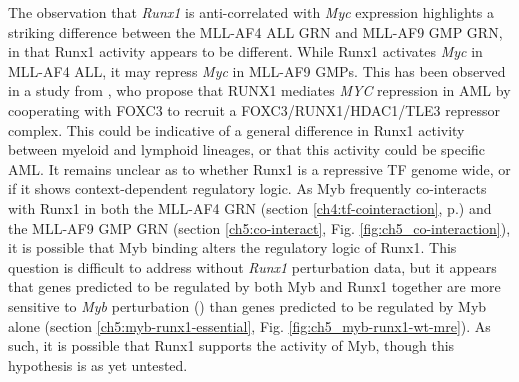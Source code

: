 The observation that \textit{Runx1} is anti-correlated with \textit{Myc} expression highlights a striking difference between the MLL-AF4 ALL GRN and MLL-AF9 GMP GRN, in that Runx1 activity appears to be different. While Runx1 activates \textit{Myc} in MLL-AF4 ALL, it may repress \textit{Myc} in MLL-AF9 GMPs. This has been observed in a study from \cite{simeoni_enhancer_2021}, who propose that RUNX1 mediates \textit{MYC} repression in AML by cooperating with FOXC3 to recruit a FOXC3/RUNX1/HDAC1/TLE3 repressor complex. This could be indicative of a general difference in Runx1 activity between myeloid and lymphoid lineages, or that this activity could be specific AML. It remains unclear as to whether Runx1 is a repressive TF genome wide, or if it shows context-dependent regulatory logic. As Myb frequently co-interacts with Runx1 in both the MLL-AF4 GRN (section \ref{ch4:tf-cointeraction}, p.\pageref{ch4:tf-cointeraction}) and the MLL-AF9 GMP GRN (section \ref{ch5:co-interact}, Fig. \ref{fig:ch5_co-interaction}), it is possible that Myb binding alters the regulatory logic of Runx1. This question is difficult to address without \textit{Runx1} perturbation data, but it appears that genes predicted to be regulated by both Myb and Runx1 together are more sensitive to \textit{Myb} perturbation (\mybmre{}) than genes predicted to be regulated by Myb alone (section \ref{ch5:myb-runx1-essential}, Fig. \ref{fig:ch5_myb-runx1-wt-mre}). As such, it is possible that Runx1 supports the activity of Myb, though this hypothesis is as yet untested.

